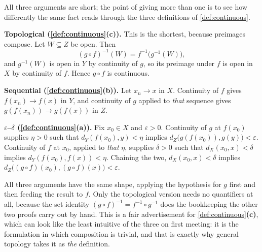 \begin{exercisesolution}
\label{sol:continuity_of_composition}
All three arguments are short; the point of giving more than one is to see how differently the
same fact reads through the three definitions of \cref{def:continuous}.

\textbf{Topological (\cref{def:continuous}\textbf{(c)}).} This is the shortest, because
preimages compose. Let $W \subseteq Z$ be open. Then
\[(g\circ f)^{-1}(W) = f^{-1}\big(g^{-1}(W)\big),\]
and $g^{-1}(W)$ is open in $Y$ by continuity of $g$, so its preimage under $f$ is open in $X$ by
continuity of $f$. Hence $g\circ f$ is continuous.

\textbf{Sequential (\cref{def:continuous}\textbf{(b)}).} Let $x_n \to x$ in $X$. Continuity of
$f$ gives $f(x_n) \to f(x)$ in $Y$, and continuity of $g$ applied to \emph{that} sequence gives
$g(f(x_n)) \to g(f(x))$ in $Z$.

\textbf{$\varepsilon$--$\delta$ (\cref{def:continuous}\textbf{(a)}).} Fix $x_0 \in X$ and
$\varepsilon > 0$. Continuity of $g$ at $f(x_0)$ supplies $\eta > 0$ such that
$d_Y(f(x_0),y) < \eta$ implies $d_Z\big(g(f(x_0)),g(y)\big) < \varepsilon$. Continuity of $f$ at
$x_0$, applied to \emph{that} $\eta$, supplies $\delta > 0$ such that $d_X(x_0,x) < \delta$
implies $d_Y(f(x_0),f(x)) < \eta$. Chaining the two, $d_X(x_0,x) < \delta$ implies
$d_Z\big((g\circ f)(x_0),(g\circ f)(x)\big) < \varepsilon$.

\begin{remark}
All three arguments have the same shape, applying the hypothesis for $g$ first and then feeding
the result to $f$. Only the topological version needs no quantifiers at all, because the set
identity $(g\circ f)^{-1} = f^{-1}\circ g^{-1}$ does the bookkeeping the other two proofs carry
out by hand. This is a fair advertisement for \cref{def:continuous}\textbf{(c)}, which can look
like the least intuitive of the three on first meeting: it is the formulation in which
composition is trivial, and that is exactly why general topology takes it as \emph{the}
definition.
\end{remark}
\end{exercisesolution}

